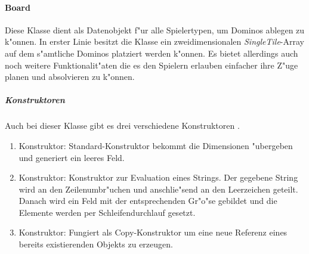 \paragraph{Board}
\label{par:board}
Diese Klasse dient als Datenobjekt f"ur alle Spielertypen, um Dominos ablegen zu k"onnen. In erster Linie besitzt die Klasse ein zweidimensionalen \emph{SingleTile}-Array auf dem s"amtliche Dominos platziert werden k"onnen. Es bietet allerdings auch noch weitere Funktionalit"aten die es den Spielern erlauben einfacher ihre Z"uge planen und absolvieren zu k"onnen. 

\subparagraph{Konstruktoren}
Auch bei dieser Klasse gibt es drei verschiedene Konstruktoren . 
\begin{enumerate}
	\item Konstruktor: Standard-Konstruktor bekommt die Dimensionen "ubergeben und generiert ein leeres Feld. 
	\item Konstruktor: Konstruktor zur Evaluation eines Strings. Der gegebene String wird an den Zeilenumbr"uchen und anschlie"send an den Leerzeichen geteilt. Danach wird ein Feld mit der entsprechenden Gr"o"se gebildet und die Elemente werden per Schleifendurchlauf gesetzt. 
	\item Konstruktor: Fungiert als Copy-Konstruktor um eine neue Referenz eines bereits existierenden Objekts zu erzeugen. 
\end{enumerate}

